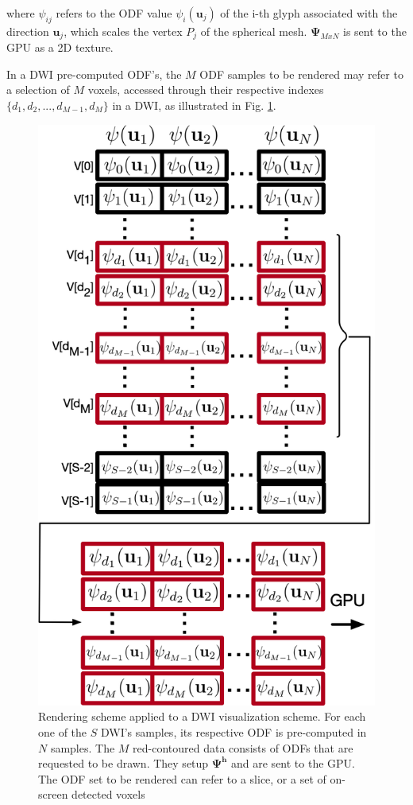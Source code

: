 \documentclass[twoside,twocolumn,10pt]{article}
\begin{document}
where $\psi_{ij}$ refers to the ODF value $\psi_i(\bm{u}_j)$ of the i-th glyph associated with the direction $\bm{u}_j$, which scales the vertex $P_j$ of the spherical mesh. $\bm{\Psi}_{MxN}$ is sent to the GPU as a 2D texture.

In a DWI pre-computed ODF's, the $M$ ODF samples to be rendered may refer to a selection of $M$ voxels, accessed through their respective indexes $\{d_1, d_2, ..., d_{M-1}, d_M\}$ in a DWI, as illustrated in Fig. \ref{fig::vmtk_precomputed2GPU}.

\begin{figure}[ht]
    \centering
    \includegraphics[width=0.89\linewidth, angle=0]{figs/rendering_scheme/organizacao2GPU_red1.png}
    \caption{Rendering scheme applied to a DWI visualization scheme. For each one of the $S$ DWI's samples, its respective ODF is pre-computed in $N$ samples. The $M$ red-contoured data consists of ODFs that are requested to be drawn. They setup $\bm{\Psi}^{\bm{h}}$ and are sent to the GPU. The ODF set to be rendered can refer to a slice, or a set of on-screen detected voxels \cite{voltoline2021}}
    \label{fig::vmtk_precomputed2GPU}
\end{figure}
\end{document}

